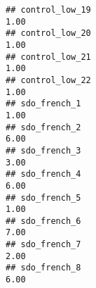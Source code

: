 \documentclass[
]{article}
\begin{document}
\begin{verbatim}
## control_low_19                                                                                                                                                                                                               1.00
## control_low_20                                                                                                                                                                                                               1.00
## control_low_21                                                                                                                                                                                                               1.00
## control_low_22                                                                                                                                                                                                               1.00
## sdo_french_1                                                                                                                                                                                                                 1.00
## sdo_french_2                                                                                                                                                                                                                 6.00
## sdo_french_3                                                                                                                                                                                                                 3.00
## sdo_french_4                                                                                                                                                                                                                 6.00
## sdo_french_5                                                                                                                                                                                                                 1.00
## sdo_french_6                                                                                                                                                                                                                 7.00
## sdo_french_7                                                                                                                                                                                                                 2.00
## sdo_french_8                                                                                                                                                                                                                 6.00

\end{verbatim}
\end{document}
